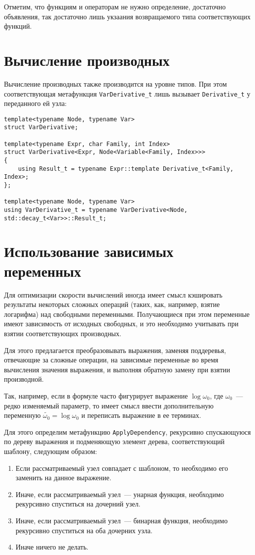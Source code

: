 \documentclass[11pt,a4paper]{article}
\begin{document}
Отметим, что функциям и операторам не нужно определение, достаточно объявления, так
достаточно лишь укзаания возвращаемого типа соответствующих функций.

\section{Вычисление производных}

Вычисление производных также производится на уровне типов. При этом соответствующая
метафункция \texttt{VarDerivative\_t} лишь вызывает \texttt{Derivative\_t} у
переданного ей узла:

\begin{lstlisting}
template<typename Node, typename Var>
struct VarDerivative;

template<typename Expr, char Family, int Index>
struct VarDerivative<Expr, Node<Variable<Family, Index>>>
{
	using Result_t = typename Expr::template Derivative_t<Family, Index>;
};

template<typename Node, typename Var>
using VarDerivative_t = typename VarDerivative<Node, std::decay_t<Var>>::Result_t;
\end{lstlisting}

\section{Использование зависимых переменных}

Для оптимизации скорости вычислений иногда имеет смысл кэшировать результаты
некоторых сложных операций (таких, как, например, взятие логарифма) над свободными
переменными.  Получающиеся при этом переменные имеют зависимость от исходных свободных,
и это необходимо учитывать при взятии соответствующих производных.

Для этого предлагается преобразовывать выражения, заменяя поддеревья, отвечающие за
сложные операции, на зависимые переменные во время вычисления значения выражения, и
выполняя обратную замену при взятии производной.

Так, например, если в формуле часто фигурирует выражение $\log \omega_0$, где
$\omega_0$~--- редко изменяемый параметр, то имеет смысл ввести дополнительную
переменную $\tilde{\omega_0} = \log \omega_0$ и переписать выражение в ее терминах.

Для этого определим метафункцию \texttt{ApplyDependency}, рекурсивно спускающуюся
по дереву выражения и подменяющую элемент дерева, соответствующий шаблону, следующим образом:
\begin{enumerate}
  \item Если рассматриваемый узел совпадает с шаблоном, то необходимо его заменить
	на данное выражение.
  \item Иначе, если рассматриваемый узел~--- унарная функция, необходимо рекурсивно
	спуститься на дочерний узел.
  \item Иначе, если рассматриваемый узел~--- бинарная функция, необходимо рекурсивно
	спуститься на оба дочерних узла.
  \item Иначе ничего не делать.
\end{enumerate}
\end{document}
